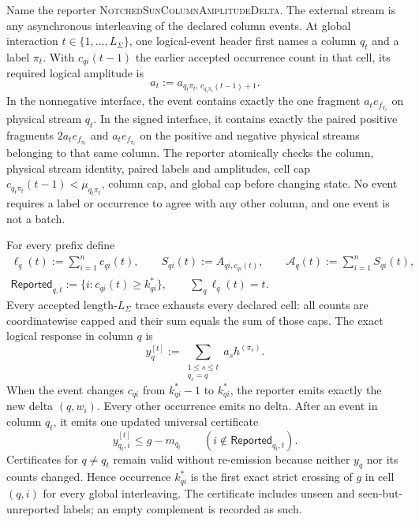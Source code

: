 \begin{theorem}
Name the reporter \textsc{NotchedSunColumnAmplitudeDelta}.  The external
stream is any asynchronous interleaving of the declared column events.  At
global interaction $t\in\{1,\ldots,L_\Sigma\}$, one logical-event header
first names a column $q_t$ and a label $\pi_t$.  With $c_{qi}(t-1)$ the
earlier accepted occurrence count in that cell, its required logical amplitude is
\begin{equation}
 a_t:=a_{q_t\pi_t,\,c_{q_t\pi_t}(t-1)+1}.
 \label{eq:notched-sun-columnwise-amplitude-event}
\end{equation}
In the nonnegative interface, the event contains exactly the one fragment
$a_te_{f_{\pi_t}}$ on physical stream $q_t$.  In the signed interface, it
contains exactly the paired positive fragments
$2a_te_{f_{\pi_t}}$ and $a_te_{f_{\pi_t}}$ on the positive and negative
physical streams belonging to that same column.  The reporter atomically
checks the column, physical stream identity, paired labels and amplitudes,
cell cap $c_{q_t\pi_t}(t-1)<\mu_{q_t\pi_t}$, column cap, and global cap before
changing state.  No event requires a label or occurrence to agree with any
other column, and one event is not a batch.

For every prefix define
\begin{equation}
 \begin{gathered}
  \ell_q(t):=\sum_{i=1}^{n}c_{qi}(t),
  \qquad
  S_{qi}(t):=A_{qi,c_{qi}(t)},
  \qquad
  \mathcal A_q(t):=\sum_{i=1}^{n}S_{qi}(t),\\
  \mathsf{Reported}_{q,t}:=
  \{i:c_{qi}(t)\geq k_{qi}^*\},
  \qquad
  \sum_q\ell_q(t)=t.
 \end{gathered}
 \label{eq:notched-sun-columnwise-amplitude-prefix-state}
\end{equation}
Every accepted length-$L_\Sigma$ trace exhausts every declared cell: all
counts are coordinatewise capped and their sum equals the sum of those caps.
The exact logical response in column $q$ is
\begin{equation}
 y_q^{[t]}:=
 \sum_{\substack{1\leq s\leq t\\q_s=q}}a_sh^{(\pi_s)}.
 \label{eq:notched-sun-columnwise-amplitude-response}
\end{equation}
When the event changes $c_{qi}$ from $k_{qi}^*-1$ to $k_{qi}^*$, the reporter
emits exactly the new delta $(q,w_i)$.  Every other occurrence emits no delta.
After an event in column $q_t$, it emits one updated universal certificate
\begin{equation}
 y_{q_t,i}^{[t]}\leq g-m_{q_t}
 \qquad(i\notin\mathsf{Reported}_{q_t,t}).
 \label{eq:notched-sun-columnwise-amplitude-certificate}
\end{equation}
Certificates for $q\ne q_t$ remain valid without re-emission because neither
$y_q$ nor its counts changed.  Hence occurrence $k_{qi}^*$ is the first exact
strict crossing of $g$ in cell $(q,i)$ for every global interleaving.  The
certificate includes unseen and seen-but-unreported labels; an empty
complement is recorded as such.


\end{theorem}
